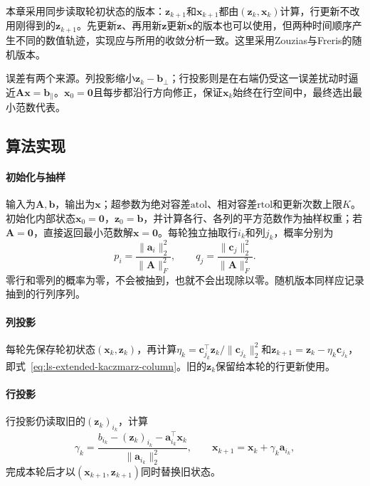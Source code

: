 本章采用同步读取轮初状态的版本：$\bm z_{k+1}$和$\bm x_{k+1}$都由$(\bm z_k,\bm x_k)$计算，行更新不改用刚得到的$\bm z_{k+1}$。先更新$\bm z$、再用新$\bm z$更新$\bm x$的版本也可以使用，但两种时间顺序产生不同的数值轨迹，实现应与所用的收敛分析一致。这里采用Zouzias与Freris的随机版本。

误差有两个来源。列投影缩小$\bm z_k-\bm b_\perp$；行投影则是在右端仍受这一误差扰动时逼近$\bm A\bm x=\bm b_\parallel$。$\bm x_0=\bm0$且每步都沿行方向修正，保证$\bm x_k$始终在行空间中，最终选出最小范数代表。

\subsection{算法实现}

\paragraph{初始化与抽样}
输入为$\bm A,\bm b$，输出为$\bm x$；超参数为绝对容差$\mathrm{atol}$、相对容差$\mathrm{rtol}$和更新次数上限$K$。初始化内部状态$\bm x_0=\bm 0$，$\bm z_0=\bm b$，并计算各行、各列的平方范数作为抽样权重；若$\bm A=\bm 0$，直接返回最小范数解$\bm x=\bm 0$。每轮独立抽取行$i_k$和列$j_k$，概率分别为
\[
 p_i=\frac{\lVert\bm a_i\rVert_2^2}{\lVert\bm A\rVert_F^2},\qquad
 q_j=\frac{\lVert\bm c_j\rVert_2^2}{\lVert\bm A\rVert_F^2}.
\]
零行和零列的概率为零，不会被抽到，也就不会出现除以零。随机版本同样应记录抽到的行列序列。

\paragraph{列投影}
每轮先保存轮初状态$(\bm x_k,\bm z_k)$，再计算$\eta_k=\bm c_{j_k}^\top\bm z_k/\lVert\bm c_{j_k}\rVert_2^2$和$\bm z_{k+1}=\bm z_k-\eta_k\bm c_{j_k}$，即式~\eqref{eq:ls-extended-kaczmarz-column}。旧的$\bm z_k$保留给本轮的行更新使用。

\paragraph{行投影}
行投影仍读取旧的$(\bm z_k)_{i_k}$，计算
\[
 \gamma_k=\frac{b_{i_k}-(\bm z_k)_{i_k}-\bm a_{i_k}^\top\bm x_k}{\lVert\bm a_{i_k}\rVert_2^2},\qquad
 \bm x_{k+1}=\bm x_k+\gamma_k\bm a_{i_k},
\]
完成本轮后才以$(\bm x_{k+1},\bm z_{k+1})$同时替换旧状态。

